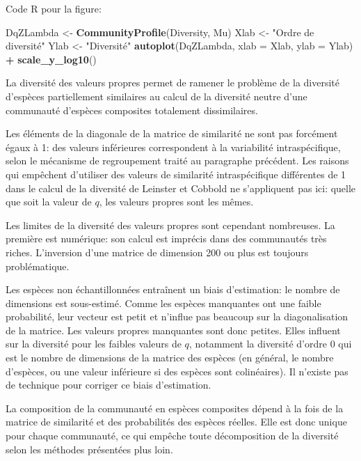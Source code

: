 \documentclass[
  11pt,
  french,
  a4paper,
  extrafontsizes,onecolumn,openright
  ]{memoir}
\newenvironment{Shaded}{\begin{snugshade}}{\end{snugshade}}
\newcommand{\DataTypeTok}[1]{\textcolor[rgb]{0.13,0.29,0.53}{#1}}
\newcommand{\KeywordTok}[1]{\textcolor[rgb]{0.13,0.29,0.53}{\textbf{#1}}}
\newcommand{\NormalTok}[1]{#1}
\newcommand{\OperatorTok}[1]{\textcolor[rgb]{0.81,0.36,0.00}{\textbf{#1}}}
\newcommand{\StringTok}[1]{\textcolor[rgb]{0.31,0.60,0.02}{#1}}
\begin{document}
\normalsize

Code R pour la figure:

\scriptsize

\begin{Shaded}
\begin{Highlighting}[]
\NormalTok{DqZLambda <-}\StringTok{ }\KeywordTok{CommunityProfile}\NormalTok{(Diversity, Mu)}
\NormalTok{Xlab <-}\StringTok{ "Ordre de diversité"}
\NormalTok{Ylab <-}\StringTok{ "Diversité"}
\KeywordTok{autoplot}\NormalTok{(DqZLambda, }\DataTypeTok{xlab =}\NormalTok{ Xlab, }\DataTypeTok{ylab =}\NormalTok{ Ylab) }\OperatorTok{+}\StringTok{ }\KeywordTok{scale_y_log10}\NormalTok{()}
\end{Highlighting}
\end{Shaded}

\normalsize

La diversité des valeurs propres permet de ramener le problème de la diversité d'espèces partiellement similaires au calcul de la diversité neutre d'une communauté d'espèces composites totalement dissimilaires.

Les éléments de la diagonale de la matrice de similarité ne sont pas forcément égaux à 1: des valeurs inférieures correspondent à la variabilité intraspécifique, selon le mécanisme de regroupement traité au paragraphe précédent.
Les raisons qui empêchent d'utiliser des valeurs de similarité intraspécifique différentes de 1 dans le calcul de la diversité de Leinster et Cobbold ne s'appliquent pas ici: quelle que soit la valeur de \(q\), les valeurs propres sont les mêmes.

Les limites de la diversité des valeurs propres sont cependant nombreuses.
La première est numérique: son calcul est imprécis dans des communautés très riches.
L'inversion d'une matrice de dimension 200 ou plus est toujours problématique.

Les espèces non échantillonnées entraînent un biais d'estimation: le nombre de dimensions est sous-estimé.
Comme les espèces manquantes ont une faible probabilité, leur vecteur est petit et n'influe pas beaucoup sur la diagonalisation de la matrice.
Les valeurs propres manquantes sont donc petites.
Elles influent sur la diversité pour les faibles valeurs de \(q\), notamment la diversité d'ordre 0 qui est le nombre de dimensions de la matrice des espèces (en général, le nombre d'espèces, ou une valeur inférieure si des espèces sont colinéaires).
Il n'existe pas de technique pour corriger ce biais d'estimation.

La composition de la communauté en espèces composites dépend à la fois de la matrice de similarité et des probabilités des espèces réelles.
Elle est donc unique pour chaque communauté, ce qui empêche toute décomposition de la diversité selon les méthodes présentées plus loin.
\end{document}
